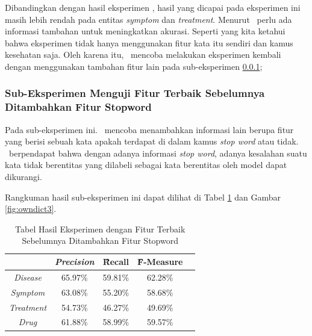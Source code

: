 	Dibandingkan dengan hasil eksperimen \cite{skripsiKakRadit}, hasil yang dicapai pada eksperimen ini masih lebih rendah pada entitas \textit{symptom} dan \textit{treatment}. Menurut \saya~perlu ada informasi tambahan untuk meningkatkan akurasi. Seperti yang kita ketahui bahwa eksperimen \cite{skripsiKakRadit} tidak hanya menggunakan fitur kata itu sendiri dan kamus kesehatan saja. Oleh karena itu, \saya~mencoba melakukan eksperimen kembali dengan menggunakan tambahan fitur lain pada sub-eksperimen \ref{eks:subekstopword};
	
	\subsubsection{Sub-Eksperimen Menguji Fitur Terbaik Sebelumnya Ditambahkan Fitur Stopword}\label{eks:subekstopword}
	Pada sub-eksperimen ini. \saya~mencoba menambahkan informasi lain berupa fitur yang berisi sebuah kata apakah terdapat di dalam kamus \textit{stop word} atau tidak. \Saya~berpendapat bahwa dengan adanya informasi \textit{stop word}, adanya kesalahan suatu kata tidak berentitas yang dilabeli sebagai kata berentitas oleh model dapat dikurangi.
	
	Rangkuman hasil sub-eksperimen ini dapat dilihat di Tabel \ref{table:owndict3} dan Gambar \ref{fig:owndict3}.
	
	\begin{table}
		\centering
		\caption{Tabel Hasil Eksperimen dengan Fitur Terbaik Sebelumnya Ditambahkan Fitur Stopword}
		\begin{tabular}{|c|c|c|c|c|}
			\hline
							      & \textit{Precision} & \f{\f{Recall}} & \f{\f{F-Measure}} \\ \hline
			\textit{Disease}      & 65.97\%             & 59.81\%        & 62.28\%           \\ \hline
			\textit{Symptom}      & 63.08\%             & 55.20\%        & 58.68\%           \\ \hline
			\textit{Treatment}    & 54.73\%             & 46.27\%        & 49.69\%           \\ \hline
			\textit{Drug}		  & 61.88\%             & 58.99\%        & 59.57\%           \\ \hline
		\end{tabular}
		\label{table:owndict3}
	\end{table}
		

